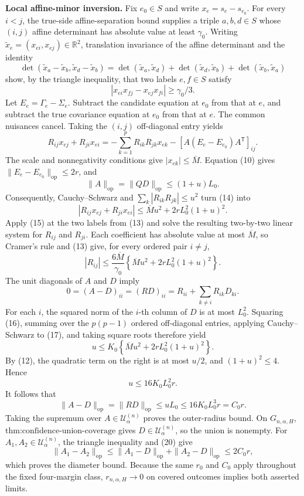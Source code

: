 \textbf{Local affine-minor inversion.}
Fix \(e_0\in S\) and write \(x_e=s_e-s_{e_0}\). For every \(i<j\), the true-side affine-separation bound supplies a triple \(a,b,d\in S\) whose \((i,j)\) affine determinant has absolute value at least \(\gamma_0\). Writing \(\widetilde x_e=(x_{ei},x_{ej})\in\mathbb R^2\), translation invariance of the affine determinant and the identity
\[
\det(\widetilde x_a-\widetilde x_b,
\widetilde x_d-\widetilde x_b)
=\det(\widetilde x_a,\widetilde x_d)
+\det(\widetilde x_d,\widetilde x_b)
+\det(\widetilde x_b,\widetilde x_a)
\]
show, by the triangle inequality, that two labels \(e,f\in S\) satisfy
\[
|x_{ei}x_{fj}-x_{ej}x_{fi}|\geq\gamma_0/3.
\tag{13}
\]
Let \(E_e=\Gamma_e-\Sigma_e\). Subtract the candidate equation at \(e_0\) from that at \(e\), and subtract the true covariance equation at \(e_0\) from that at \(e\). The common nuisances cancel. Taking the \((i,j)\) off-diagonal entry yields
\[
R_{ij}x_{ej}+R_{ji}x_{ei}
=-\sum_{k=1}^pR_{ik}R_{jk}x_{ek}
-[A(E_e-E_{e_0})A^{\mathsf T}]_{ij}.
\tag{14}
\]
The scale and nonnegativity conditions give \(|x_{ek}|\leq\overline M\). Equation (10) gives \(\|E_e-E_{e_0}\|_{\mathrm{op}}\leq2r\), and
\[
\|A\|_{\mathrm{op}}=\|QD\|_{\mathrm{op}}
\leq(1+u)L_0.
\]
Consequently, Cauchy--Schwarz and \(\sum_k|R_{ik}R_{jk}|\leq u^2\) turn (14) into
\[
|R_{ij}x_{ej}+R_{ji}x_{ei}|
\leq\overline M u^2+2rL_0^2(1+u)^2.
\tag{15}
\]
Apply (15) at the two labels from (13) and solve the resulting two-by-two linear system for \(R_{ij}\) and \(R_{ji}\). Each coefficient has absolute value at most \(\overline M\), so Cramer's rule and (13) give, for every ordered pair \(i\neq j\),
\[
|R_{ij}|
\leq\frac{6\overline M}{\gamma_0}
\left\{\overline M u^2+2rL_0^2(1+u)^2\right\}.
\tag{16}
\]
The unit diagonals of \(A\) and \(D\) imply
\[
0=(A-D)_{ii}=(RD)_{ii}
=R_{ii}+\sum_{k\neq i}R_{ik}D_{ki}.
\tag{17}
\]
For each \(i\), the squared norm of the \(i\)-th column of \(D\) is at most \(L_0^2\). Squaring (16), summing over the \(p(p-1)\) ordered off-diagonal entries, applying Cauchy--Schwarz to (17), and taking square roots therefore yield
\[
u\leq K_0
\left\{\overline M u^2+2rL_0^2(1+u)^2\right\}.
\tag{18}
\]
By (12), the quadratic term on the right is at most \(u/2\), and \((1+u)^2\leq4\). Hence
\[
u\leq16K_0L_0^2r.
\tag{19}
\]
It follows that
\[
\|A-D\|_{\mathrm{op}}
=\|RD\|_{\mathrm{op}}
\leq uL_0
\leq16K_0L_0^3r
=C_0r.
\tag{20}
\]
Taking the supremum over \(A\in\mathcal U^{(n)}_\alpha\) proves the outer-radius bound. On \(G_{n,\alpha,H}\), \(\text{thm:confidence-union-coverage}\) gives \(D\in\mathcal U^{(n)}_\alpha\), so the union is nonempty. For \(A_1,A_2\in\mathcal U^{(n)}_\alpha\), the triangle inequality and (20) give
\[
\|A_1-A_2\|_{\mathrm{op}}
\leq\|A_1-D\|_{\mathrm{op}}+\|A_2-D\|_{\mathrm{op}}
\leq2C_0r,
\]
which proves the diameter bound. Because the same \(r_0\) and \(C_0\) apply throughout the fixed four-margin class, \(r_{n,\alpha,H}\to0\) on covered outcomes implies both asserted limits.